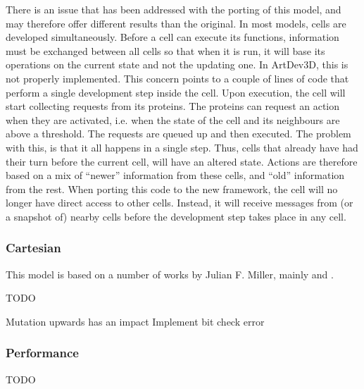 There is an issue that has been addressed with the porting of this model, and may therefore offer different results than the original. In most models, cells are developed simultaneously. Before a cell can execute its functions, information must be exchanged between all cells so that when it is run, it will base its operations on the current state and not the updating one. In ArtDev3D, this is not properly implemented. This concern points to a couple of lines of code that perform a single development step inside the cell. Upon execution, the cell will start collecting requests from its proteins. The proteins can request an action when they are activated, i.e. when the state of the cell and its neighbours are above a threshold. The requests are queued up and then executed. The problem with this, is that it all happens in a single step. Thus, cells that already have had their turn before the current cell, will have an altered state. Actions are therefore based on a mix of ``newer'' information from these cells, and ``old'' information from the rest. When porting this code to the new framework, the cell will no longer have direct access to other cells. Instead, it will receive messages from (or a snapshot of) nearby cells before the development step takes place in any cell.

\subsubsection{Cartesian}
This model is based on a number of works by Julian F. Miller, mainly \cite{mteurogp2000} and \cite{ecal2003}. 

TODO

Mutation upwards has an impact
Implement bit check error

\subsubsection{Performance}

TODO

